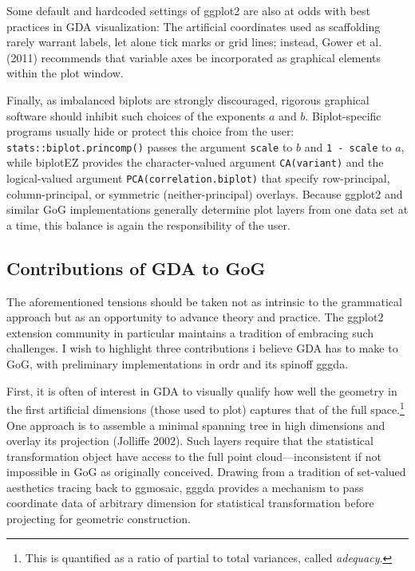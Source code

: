 \documentclass[
]{article}
\begin{document}
Some default and hardcoded settings of \textsf{ggplot2} are also at odds
with best practices in GDA visualization: The artificial coordinates
used as scaffolding rarely warrant labels, let alone tick marks or grid
lines; instead, Gower et al. (2011) recommends that variable axes be
incorporated as graphical elements within the plot window.

Finally, as imbalanced biplots are strongly discouraged, rigorous
graphical software should inhibit such choices of the exponents \(a\)
and \(b\). Biplot-specific programs usually hide or protect this choice
from the user: \texttt{stats::biplot.princomp()} passes the argument
\texttt{scale} to \(b\) and \texttt{1\ -\ scale} to \(a\), while
\textsf{biplotEZ} provides the character-valued argument
\texttt{CA(variant)} and the logical-valued argument
\texttt{PCA(correlation.biplot)} that specify row-principal,
column-principal, or symmetric (neither-principal) overlays. Because
\textsf{ggplot2} and similar GoG implementations generally determine
plot layers from one data set at a time, this balance is again the
responsibility of the user.

\subsection{Contributions of GDA to
GoG}\label{contributions-of-gda-to-gog}

The aforementioned tensions should be taken not as intrinsic to the
grammatical approach but as an opportunity to advance theory and
practice. The \textsf{ggplot2} extension community in particular
maintains a tradition of embracing such challenges. I wish to highlight
three contributions i believe GDA has to make to GoG, with preliminary
implementations in \textsf{ordr} and its spinoff \textsf{gggda}.

First, it is often of interest in GDA to visually qualify how well the
geometry in the first artificial dimensions (those used to plot)
captures that of the full space.\footnote{This is quantified as a ratio
  of partial to total variances, called \emph{adequacy}.} One approach
is to assemble a minimal spanning tree in high dimensions and overlay
its projection (Jolliffe 2002). Such layers require that the statistical
transformation object have access to the full point cloud---inconsistent
if not impossible in GoG as originally conceived. Drawing from a
tradition of set-valued aesthetics tracing back to \textsf{ggmosaic},
\textsf{gggda} provides a mechanism to pass coordinate data of arbitrary
dimension for statistical transformation before projecting for geometric
construction.
\end{document}
